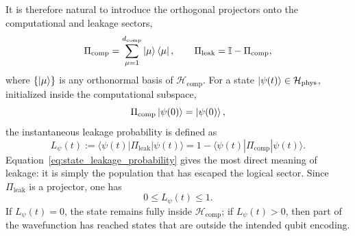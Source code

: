 It is therefore natural to introduce the orthogonal projectors onto the computational and leakage sectors,
\begin{equation}
\Pi_{\mathrm{comp}}
=
\sum_{\mu=1}^{d_{\mathrm{comp}}}
\ket{\mu}\bra{\mu},
\qquad
\Pi_{\mathrm{leak}}
=
\mathbb{I}-\Pi_{\mathrm{comp}},
\label{eq:projectors_comp_leak}
\end{equation}
where $\{\ket{\mu}\}$ is any orthonormal basis of $\mathcal{H}_{\mathrm{comp}}$. For a state $\ket{\psi(t)} \in \mathcal{H}_{\mathrm{phys}}$, initialized inside the computational subspace,
\begin{equation}
\Pi_{\mathrm{comp}}\ket{\psi(0)}=\ket{\psi(0)},
\label{eq:initial_state_in_comp}
\end{equation}
the instantaneous leakage probability is defined as
\begin{equation}
L_{\psi}(t)
:=
\langle \psi(t) | \Pi_{\mathrm{leak}} | \psi(t) \rangle
=
1-\langle \psi(t) | \Pi_{\mathrm{comp}} | \psi(t) \rangle.
\label{eq:state_leakage_probability}
\end{equation}
Equation~\eqref{eq:state_leakage_probability} gives the most direct meaning of leakage: it is simply the population that has escaped the logical sector. Since $\Pi_{\mathrm{leak}}$ is a projector, one has
\begin{equation}
0 \leq L_{\psi}(t) \leq 1.
\label{eq:state_leakage_bounds}
\end{equation}
If $L_{\psi}(t)=0$, the state remains fully inside $\mathcal{H}_{\mathrm{comp}}$; if $L_{\psi}(t)>0$, then part of the wavefunction has reached states that are outside the intended qubit encoding.

